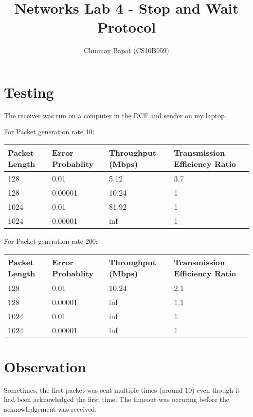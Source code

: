 \documentclass[11pt]{article}
\author{Chinmay Bapat (CS10B059)}
\title{Networks Lab 4 - Stop and Wait Protocol}
\begin{document}
\maketitle
\section{Testing}
The receiver was run on a computer in the DCF and sender on my laptop.

For Packet generation rate 10:

\begin{tabular} {l l l l }
Packet Length & Error Probablity & Throughput (Mbps) & Transmission Efficiency Ratio\\ \hline
128 & 0.01 & 5.12 & 3.7\\
128 & 0.00001 & 10.24 & 1\\
1024 & 0.01 & 81.92 & 1\\
1024 & 0.00001 & inf & 1\\
\end{tabular}


For Packet generation rate 200:

\begin{tabular} {l l l l }
Packet Length & Error Probablity & Throughput (Mbps) & Transmission Efficiency Ratio\\ \hline
128 & 0.01 & 10.24 & 2.1\\
128 & 0.00001 & inf & 1.1\\
1024 & 0.01 & inf & 1\\
1024 & 0.00001 & inf & 1\\
\end{tabular}

\section{Observation}
Sometimes, the first packet was sent multiple times (around 10)
even though it had been acknowledged the first time. The timeout was occuring
before the acknowledgement was received.
\end{document}
